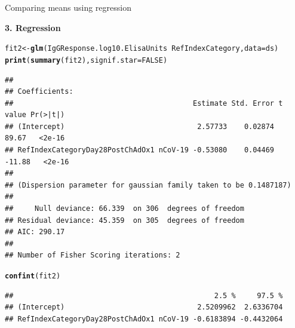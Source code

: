 \documentclass[10pt]{beamer}\usepackage[]{graphicx}\usepackage[]{color}
\makeatletter
\newcommand{\hlnum}[1]{\textcolor[rgb]{0.686,0.059,0.569}{#1}}%
\newcommand{\hlopt}[1]{\textcolor[rgb]{0,0,0}{#1}}%
\newcommand{\hlstd}[1]{\textcolor[rgb]{0.345,0.345,0.345}{#1}}%
\newcommand{\hlkwb}[1]{\textcolor[rgb]{0.69,0.353,0.396}{#1}}%
\newcommand{\hlkwc}[1]{\textcolor[rgb]{0.333,0.667,0.333}{#1}}%
\newcommand{\hlkwd}[1]{\textcolor[rgb]{0.737,0.353,0.396}{\textbf{#1}}}%
\newenvironment{kframe}{%
 \def\at@end@of@kframe{}%
 \ifinner\ifhmode%
  \def\at@end@of@kframe{\end{minipage}}%
  \begin{minipage}{\columnwidth}%
 \fi\fi%
 \def\FrameCommand##1{\hskip\@totalleftmargin \hskip-\fboxsep
 \colorbox{shadecolor}{##1}\hskip-\fboxsep
     \hskip-\linewidth \hskip-\@totalleftmargin \hskip\columnwidth}%
 \MakeFramed {\advance\hsize-\width
   \@totalleftmargin\z@ \linewidth\hsize
   \@setminipage}}%
 {\par\unskip\endMakeFramed%
 \at@end@of@kframe}
\newenvironment{knitrout}{}{} %
\makeatother
\begin{document}
\begin{frame}[fragile]{Comparing means using regression}
	
\textbf{3. Regression} \\
	
\begin{knitrout}\tiny
{}\color{fgcolor}\begin{kframe}
\begin{alltt}
\hlstd{fit2} \hlkwb{<-} \hlkwd{glm}\hlstd{(IgGResponse.log10.ElisaUnits} \hlopt{~} \hlstd{RefIndexCategory,} \hlkwc{data} \hlstd{= ds)}
\hlkwd{print}\hlstd{(}\hlkwd{summary}\hlstd{(fit2),} \hlkwc{signif.star} \hlstd{=} \hlnum{FALSE}\hlstd{)}
\end{alltt}
\begin{verbatim}
## 
## Coefficients:
##                                          Estimate Std. Error t value Pr(>|t|)
## (Intercept)                               2.57733    0.02874   89.67   <2e-16
## RefIndexCategoryDay28PostChAdOx1 nCoV-19 -0.53080    0.04469  -11.88   <2e-16
## 
## (Dispersion parameter for gaussian family taken to be 0.1487187)
## 
##     Null deviance: 66.339  on 306  degrees of freedom
## Residual deviance: 45.359  on 305  degrees of freedom
## AIC: 290.17
## 
## Number of Fisher Scoring iterations: 2
\end{verbatim}
\begin{alltt}
\hlkwd{confint}\hlstd{(fit2)}
\end{alltt}
\begin{verbatim}
##                                               2.5 %     97.5 %
## (Intercept)                               2.5209962  2.6336704
## RefIndexCategoryDay28PostChAdOx1 nCoV-19 -0.6183894 -0.4432064
\end{verbatim}
\end{kframe}
\end{knitrout}

\end{frame}
\end{document}
